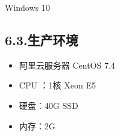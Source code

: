 \documentclass{article}
\begin{document}
\noindent{}Windows 10%

\subsection{6.3.\hspace*{0.5em}生产环境}\label{63}%

\begin{itemize}[noitemsep,topsep=\mdcompacttopsep]%

\item{}阿里云服务器 CentOS 7.4%

\item{}CPU ：1核 Xeon E5%

\item{}硬盘：40G SSD%

\item{}内存：2G%
\end{itemize}%
\end{document}
